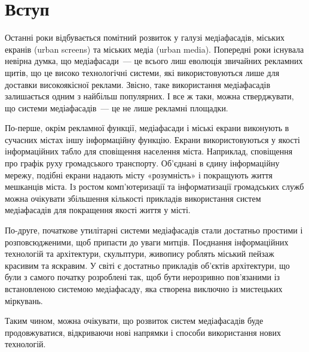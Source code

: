 \documentclass[a4paper,ukrainian,utf8,nocolumnsxix,nocolumnxxxii,nocolumnxxxi,floatsection,equationsection]{eskdtext}
\newcommand{\sectionnonum}[1]{\section*{#1}\addcontentsline{toc}{section}{#1}}
\begin{document}


{}






\tableofcontents


\sectionnonum{Вступ}
\label{sec:intro}

Останні роки відбувається помітний розвиток у галузі медіафасадів, міських екранів (urban screens) та міських медіа (urban media). Попередні роки існувала невірна думка, що медіафасади~--- це всього лиш еволюція звичайних рекламних щитів, що це високо технологічні системи, які використовуються лише для доставки високоякісної реклами. Звісно, таке використання медіафасадів залишається одним з найбільш популярних. І все ж таки, можна стверджувати, що системи медіафасадів~--- це не лише рекламні площадки. 

По-перше, окрім рекламної функції, медіафасади і міські екрани виконують в сучасних містах іншу інформаційну функцію. Екрани використовуються у якості інформаційних табло для сповіщення населення міста. Наприклад, сповіщення про графік руху громадського транспорту. Об'єднані в єдину інформаційну мережу, подібні екрани надають місту «розумність» і покращують життя мешканців міста. Із ростом комп'ютеризації та інформатизації громадських служб можна очікувати збільшення кількості прикладів використання систем медіафасадів для покращення якості життя у місті.

По-друге, початкове утилітарні системи медіафасадів стали достатньо простими і розповсюдженими, щоб припасти до уваги митців. Поєднання інформаційних технологій та архітектури, скульптури, живопису роблять міський пейзаж красивим та яскравим. У світі є достатньо прикладів об'єктів архітектури, що були з самого початку розроблені так, щоб бути нерозривно пов'язаними із встановленою системою медіафасаду, яка створена виключно із мистецьких міркувань. 

Таким чином, можна очікувати, що розвиток систем медіафасадів буде продовжуватися, відкриваючи нові напрямки і способи використання нових технологій.  
\end{document}
